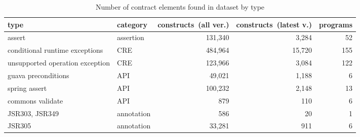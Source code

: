 \begin{table}[t]
\centering
\caption{Number of contract elements found in dataset by type}
\label{tab:contractsbytype}
\begin{tabular}{|p{5cm}|p{3cm}|r|r|r|} \hline
   type & category & \parbox{1.2cm}{constructs\ (all ver.)}  & \parbox{1.2cm}{constructs\ (latest v.)} & pro\-grams \\ \hline
	assert &  assertion &  131,340 &  3,284 &  52 \\ 
	conditional runtime exceptions &  CRE &  484,964 &  15,720 &  155 \\ 
	unsupported operation exception &  CRE &  123,966 &  3,084 &  122 \\ 
	guava preconditions &  API &  49,021 &  1,188 &  6 \\ 
	spring assert &  API &  100,232 &  2,148 &  13 \\ 
	commons validate &  API &  879 &  110 &  6 \\ 
	JSR303, JSR349 &  annotation &  586 &  20 &  1 \\ 
	JSR305 &  annotation &  33,281 &  911 &  6 \\ 
\hline
\end{tabular}
\end{table}
